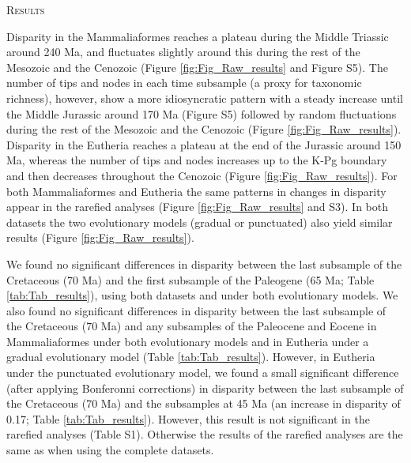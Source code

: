 \documentclass[12pt,letterpaper]{article}
\renewcommand{\section}[1]{%
\bigskip
\begin{center}
\begin{Large}
\normalfont\scshape #1
\medskip
\end{Large}
\end{center}}
\begin{document}
%
%

\section{Results}
Disparity in the Mammaliaformes reaches a plateau during the Middle Triassic around 240 Ma, and fluctuates slightly around this during the rest of the Mesozoic and the Cenozoic (Figure \ref{fig:Fig_Raw_results} and Figure S5).
The number of tips and nodes in each time subsample (a proxy for taxonomic richness), however, show a more idiosyncratic pattern with a steady increase until the Middle Jurassic around 170 Ma (Figure S5) followed by random fluctuations during the rest of the Mesozoic and the Cenozoic (Figure \ref{fig:Fig_Raw_results}).
Disparity in the Eutheria reaches a plateau at the end of the Jurassic around 150 Ma, whereas the number of tips and nodes increases up to the K-Pg boundary and then decreases throughout the Cenozoic (Figure \ref{fig:Fig_Raw_results}).
For both Mammaliaformes and Eutheria the same patterns in changes in disparity appear in the rarefied analyses (Figure \ref{fig:Fig_Raw_results} and S3).
In both datasets the two evolutionary models (gradual or punctuated) also yield similar results (Figure \ref{fig:Fig_Raw_results}).

We found no significant differences in disparity between the last subsample of the Cretaceous (70 Ma) and the first subsample of the Paleogene (65 Ma; Table \ref{tab:Tab_results}), using both datasets and under both evolutionary models. 
We also found no significant differences in disparity between the last subsample of the Cretaceous (70 Ma) and any subsamples of the Paleocene and Eocene in Mammaliaformes under both evolutionary models and in Eutheria under a gradual evolutionary model (Table \ref{tab:Tab_results}).
However, in Eutheria under the punctuated evolutionary model, we found a small significant difference (after applying Bonferonni corrections) in disparity between the last subsample of the Cretaceous (70 Ma) and the subsamples at 45 Ma (an increase in disparity of 0.17; Table \ref{tab:Tab_results}).
However, this result is not significant in the rarefied analyses (Table S1). 
Otherwise the results of the rarefied analyses are the same as when using the complete datasets. 
\end{document}
